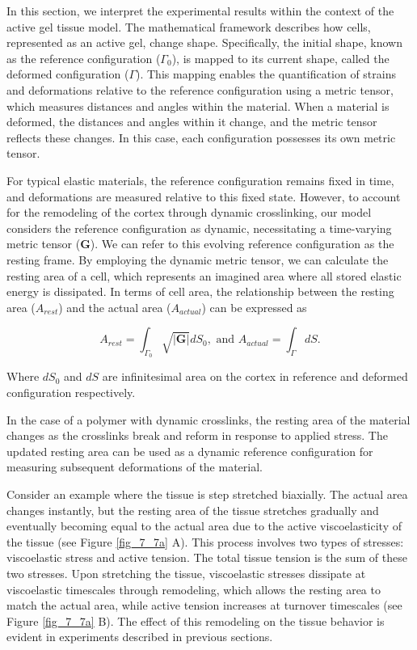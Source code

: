 In this section, we interpret the experimental results within the context of the active gel tissue model. The mathematical framework describes how cells, represented as an active gel, change shape. Specifically, the initial shape, known as the reference configuration (\(\Gamma_{0}\)), is mapped to its current shape, called the deformed configuration (\(\Gamma\)). This mapping enables the quantification of strains and deformations relative to the reference configuration using a metric tensor, which measures distances and angles within the material. When a material is deformed, the distances and angles within it change, and the metric tensor reflects these changes. In this case, each configuration possesses its own metric tensor.

For typical elastic materials, the reference configuration remains fixed in time, and deformations are measured relative to this fixed state. However, to account for the remodeling of the cortex through dynamic crosslinking, our model considers the reference configuration as dynamic, necessitating a time-varying metric tensor  (\(\mathbf{G}\)). We can refer to this evolving reference configuration as the resting frame. By employing the dynamic metric tensor, we can calculate the resting area of a cell, which represents an imagined area where all stored elastic energy is dissipated. In terms of cell area, the relationship between the resting area (\(A_{rest}\)) and the actual area (\(A_{actual}\)) can be expressed as

\begin{equation}
	A_{rest} = \int_{\Gamma_0} \sqrt{|\mathbf{G}|}dS_0, \text{ and } A_{actual} = \int_{\Gamma}dS.
\end{equation}

Where $dS_{0}$ and $dS$ are infinitesimal area on the cortex in
reference and deformed configuration respectively.

In the case of a polymer with dynamic crosslinks, the resting area of the material changes as the crosslinks break and reform in response to applied stress. The updated resting area can be used as a dynamic reference configuration for measuring subsequent deformations of the material.

Consider an example where the tissue is step stretched biaxially. The actual area changes instantly, but the resting area of the tissue stretches gradually and eventually becoming equal to the actual area due to the active viscoelasticity of the tissue (see Figure \ref{fig_7_7a} A). This process involves two types of stresses: viscoelastic stress and active tension. The total tissue tension is the sum of these two stresses. Upon stretching the tissue, viscoelastic stresses dissipate at viscoelastic timescales through remodeling, which allows the resting area to match the actual area, while active tension increases at turnover timescales (see Figure \ref{fig_7_7a} B). The effect of this remodeling on the tissue behavior is evident in experiments described in previous sections.

